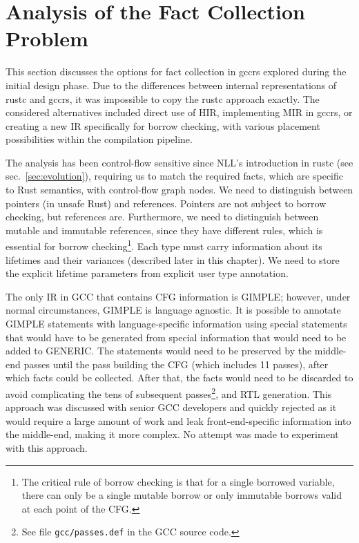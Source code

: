 \documentclass[
  11pt,
  twoside,symmetric]{report}
\begin{document}
\section{Analysis of the Fact Collection
Problem}\label{sec:analysis-of-the-fact-collection-problem}

This section discusses the options for fact collection in gccrs explored
during the initial design phase. Due to the differences between internal
representations of rustc and gccrs, it was impossible to copy the rustc
approach exactly. The considered alternatives included direct use of
HIR, implementing MIR in gccrs, or creating a new IR specifically for
borrow checking, with various placement possibilities within the
compilation pipeline.

The analysis has been control-flow sensitive since NLL's introduction in
rustc (see sec.~\ref{sec:evolution}), requiring us to match the required
facts, which are specific to Rust semantics, with control-flow graph
nodes. We need to distinguish between pointers (in unsafe Rust) and
references. Pointers are not subject to borrow checking, but references
are. Furthermore, we need to distinguish between mutable and immutable
references, since they have different rules, which is essential for
borrow checking\footnote{The critical rule of borrow checking is that
  for a single borrowed variable, there can only be a single mutable
  borrow or only immutable borrows valid at each point of the CFG.}.
Each type must carry information about its lifetimes and their variances
(described later in this chapter). We need to store the explicit
lifetime parameters from explicit user type annotation.

The only IR in GCC that contains CFG information is GIMPLE; however,
under normal circumstances, GIMPLE is language agnostic. It is possible
to annotate GIMPLE statements with language-specific information using
special statements that would have to be generated from special
information that would need to be added to GENERIC. The statements would
need to be preserved by the middle-end passes until the pass building
the CFG (which includes 11 passes), after which facts could be
collected. After that, the facts would need to be discarded to avoid
complicating the tens of subsequent
passes\footnote{See file \texttt{gcc/passes.def} in the GCC source code.}, and RTL generation. This approach was discussed with senior
GCC developers and quickly rejected as it would require a large amount
of work and leak front-end-specific information into the middle-end,
making it more complex. No attempt was made to experiment with this
approach.
\end{document}
